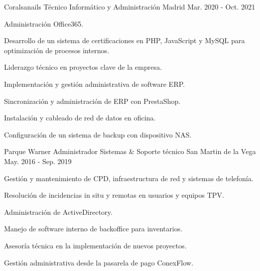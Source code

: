 \begin{cventries}
  \cventry
    {Coralsanails} %
    {Técnico Informático y Administración} %
    {Madrid} %
    {Mar. 2020 - Oct. 2021} %
    {
      \begin{cvitems} %
        \item {Administración Office365.}
        \item {Desarrollo de un sistema de certificaciones en PHP, JavaScript y MySQL para optimización de procesos internos.}
        \item {Liderazgo técnico en proyectos clave de la empresa.}
        \item {Implementación y gestión administrativa de software ERP.}
        \item {Sincronización y administración de ERP con PrestaShop.}
        \item {Instalación y cableado de red de datos en oficina.}
        \item {Configuración de un sistema de backup con dispositivo NAS.}
      \end{cvitems}
    }

  \cventry
    {Parque Warner} %
    {Administrador Sistemas \& Soporte técnico} %
    {San Martin de la Vega} %
    {May. 2016 - Sep. 2019} %
    {
      \begin{cvitems} %
        \item {Gestión y mantenimiento de CPD, infraestructura de red y sistemas de telefonía.}
        \item {Resolución de incidencias in situ y remotas en usuarios y equipos TPV.}
        \item {Administración de ActiveDirectory.}
        \item {Manejo de software interno de backoffice para inventarios.}
        \item {Asesoría técnica en la implementación de nuevos proyectos.}
        \item {Gestión administrativa desde la pasarela de pago ConexFlow.}
      \end{cvitems}
    }



\end{cventries}
